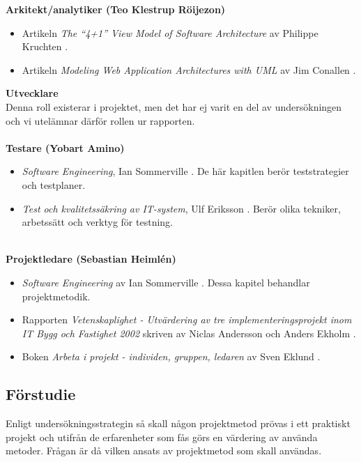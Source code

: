 \documentclass[conference,a4paper]{IEEEtran}
\begin{document}
\noindent \textbf{Arkitekt/analytiker (Teo Klestrup Röijezon)}
\begin{itemize}
\item Artikeln \textit{The “4+1” View Model of Software Architecture} av Philippe Kruchten \cite{Kruchten95}.
\item Artikeln \textit{Modeling Web Application Architectures with UML} av Jim Conallen \cite{Conallen99}.
\\
\end{itemize}

\noindent \textbf{Utvecklare}\\
\indent Denna roll existerar i projektet, men det har ej varit en del av undersökningen och vi utelämnar därför rollen ur rapporten.\\
\\
\noindent \textbf{Testare (Yobart Amino)}
\begin{itemize}
\item  \textit{Software Engineering}, Ian Sommerville \cite[kap.1-3,8]{Sommerville10}. De här kapitlen berör teststrategier och testplaner.
\item \textit{Test och kvalitetssäkring av IT-system}, Ulf Eriksson \cite{eriksson_2008}.  Berör olika tekniker, arbetssätt och verktyg för testning.
\\
\\
\end{itemize}

\noindent \textbf{Projektledare (Sebastian Heimlén)}
\begin{itemize}
\item \textit{Software Engineering} av Ian Sommerville \cite[kap. 22,23,26]{Sommerville10}. Dessa kapitel behandlar projektmetodik.
\\
\item Rapporten \textit{Vetenskaplighet - Utvärdering av tre implementeringsprojekt inom IT Bygg och Fastighet 2002} skriven av Niclas Andersson och Anders Ekholm \cite{Andersson02}.
\\
\item Boken \textit{Arbeta i projekt - individen, gruppen, ledaren} av Sven Eklund \cite{Eklund14}.
\\
\end{itemize}

\subsection{Förstudie}
Enligt undersökningsstrategin så skall någon projektmetod prövas i ett praktiskt projekt och utifrån de erfarenheter som fås görs en värdering av använda metoder. Frågan är då vilken ansats av projektmetod som skall användas.
\end{document}
